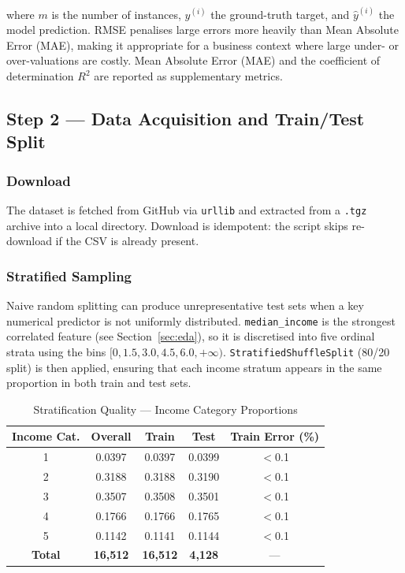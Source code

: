 \documentclass[conference]{IEEEtran}
\begin{document}
where $m$ is the number of instances, $y^{(i)}$ the ground-truth target, and $\hat{y}^{(i)}$ the model prediction. RMSE penalises large errors more heavily than Mean Absolute Error (MAE), making it appropriate for a business context where large under- or over-valuations are costly. Mean Absolute Error (MAE) and the coefficient of determination $R^2$ are reported as supplementary metrics.

\subsection{Step 2 — Data Acquisition and Train/Test Split}
\label{subsec:split}

\subsubsection{Download}
The dataset is fetched from GitHub via \texttt{urllib} and extracted from a \texttt{.tgz} archive into a local directory. Download is idempotent: the script skips re-download if the CSV is already present.

\subsubsection{Stratified Sampling}
Naive random splitting can produce unrepresentative test sets when a key numerical predictor is not uniformly distributed. \texttt{median\_income} is the strongest correlated feature (see Section~\ref{sec:eda}), so it is discretised into five ordinal strata using the bins $[0, 1.5, 3.0, 4.5, 6.0, +\infty)$. \texttt{StratifiedShuffleSplit} (80/20 split) is then applied, ensuring that each income stratum appears in the same proportion in both train and test sets.

\begin{table}[H]
\centering
\caption{Stratification Quality — Income Category Proportions}
\label{tab:stratification}
\begin{tabular}{@{}ccccc@{}}
\toprule
\textbf{Income Cat.} & \textbf{Overall} & \textbf{Train} & \textbf{Test} & \textbf{Train Error (\%)} \\
\midrule
1 & 0.0397 & 0.0397 & 0.0399 & $<$0.1 \\
2 & 0.3188 & 0.3188 & 0.3190 & $<$0.1 \\
3 & 0.3507 & 0.3508 & 0.3501 & $<$0.1 \\
4 & 0.1766 & 0.1766 & 0.1765 & $<$0.1 \\
5 & 0.1142 & 0.1141 & 0.1144 & $<$0.1 \\
\midrule
\textbf{Total} & \textbf{16,512} & \textbf{16,512} & \textbf{4,128} & — \\
\bottomrule
\end{tabular}
\end{table}
\end{document}

